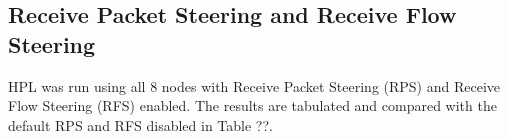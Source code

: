 %


%
%
\subsection{Receive Packet Steering and Receive Flow Steering}

HPL was run using all 8 nodes with Receive Packet Steering (RPS) and Receive Flow Steering (RFS) enabled. The results are tabulated and compared with the default RPS and RFS disabled in Table ??.

